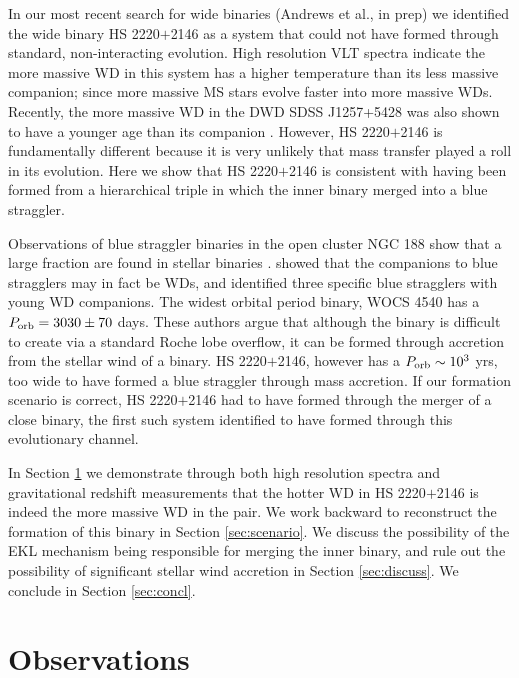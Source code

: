 \documentclass{emulateapj}
\begin{document}
In our most recent search for wide binaries (Andrews et al., in prep) we identified the wide binary HS 2220$+$2146 as a system that could not have formed through standard, non-interacting evolution. High resolution VLT spectra indicate the more massive WD in this system has a higher temperature than its less massive companion; since more massive MS stars evolve faster into more massive WDs. Recently, the more massive WD in the DWD SDSS J1257+5428 \citep{badenes09,marsh11} was also shown to have a younger age than its companion \citep{bours15}. However, HS 2220$+$2146 is fundamentally different because it is very unlikely that mass transfer played a roll in its evolution. Here we show that HS 2220$+$2146 is consistent with having been formed from a hierarchical triple in which the inner binary merged into a blue straggler. 


Observations of blue straggler binaries in the open cluster NGC 188 show that a large fraction are found in stellar binaries \citep{mathieu09}. \citet{geller11} showed that the companions to blue stragglers may in fact be WDs, and \citet{gosnell14} identified three specific blue stragglers with young WD companions. The widest orbital period binary, WOCS 4540 has a $P_{\rm orb} = 3030\pm70$ days. These authors argue that although the binary is difficult to create via a standard Roche lobe overflow, it can be formed through accretion from the stellar wind of a binary. HS 2220$+$2146, however has a $P_{\rm orb} \sim 10^3$ yrs, too wide to have formed a blue straggler through mass accretion. If our formation scenario is correct, HS 2220$+$2146 had to have formed through the merger of a close binary, the first such system identified to have formed through this evolutionary channel.


In Section \ref{sec:obs} we demonstrate through both high resolution spectra and gravitational redshift measurements that the hotter WD in HS 2220$+$2146 is indeed the more massive WD in the pair. We work backward to reconstruct the formation of this binary in Section \ref{sec:scenario}. We discuss the possibility of the EKL mechanism being responsible for merging the inner binary, and rule out the possibility of significant stellar wind accretion in Section \ref{sec:discuss}. We conclude in Section \ref{sec:concl}.



\section{Observations} \label{sec:obs}
\end{document}
